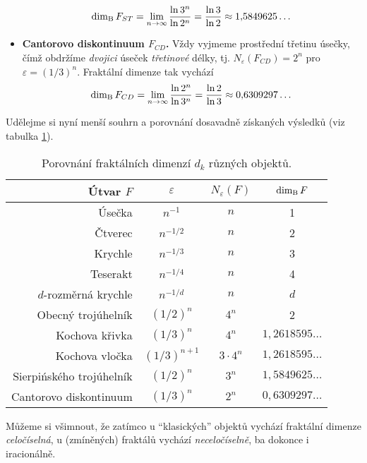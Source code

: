\begin{itemize}
    \begin{equation}\label{eq:sierpinskeho-trojuhelnik-dimenze}
        \operatorname{dim_B}{F_{ST}}=\lim_{n\to\infty}{\dfrac{\ln{3^n}}{\ln{2^{n}}}}=\dfrac{\ln{3}}{\ln{2}}\approx 1{,}5849625\dots
    \end{equation}
    \item \textbf{Cantorovo diskontinuum $F_{CD}$.} Vždy vyjmeme prostřední třetinu úsečky, čímž obdržíme \emph{dvojici} úseček \emph{třetinové} délky, tj. $N_\varepsilon(F_{CD})=2^n$ pro $\varepsilon=(1/3)^n$. Fraktální dimenze tak vychází
    \begin{equation}\label{eq:cantorovo-diskontinuum-dimenze}
        \operatorname{dim_B}{F_{CD}}=\lim_{n\to\infty}{\dfrac{\ln{2^n}}{\ln{3^n}}}=\dfrac{\ln{2}}{\ln{3}}\approx 0{,}6309297\dots
    \end{equation}
\end{itemize}
Udělejme si nyní menší souhrn a porovnání dosavadně získaných výsledků (viz tabulka \ref{table:fraktaly-eukleides-dimenze}).
\begin{table}[h]
    \centering
    \begin{tabular}{r|ccc}
        Útvar $F$                & $\varepsilon$ & $N_\varepsilon(F)$ & $\operatorname{dim_B}{F}$         \\ \hline
        Úsečka                   & $n^{-1}$      & $n$                & 1                  \\
        Čtverec                  & $n^{-1/2}$    & $n$                & 2                  \\
        Krychle                  & $n^{-1/3}$    & $n$                & 3                  \\
        Teserakt                 & $n^{-1/4}$    & $n$                & 4                  \\
        $d$-rozměrná krychle     & $n^{-1/d}$    & $n$                & $d$                \\
        Obecný trojúhelník       & $(1/2)^n$     & $4^n$              & 2                  \\
        Kochova křivka           & $(1/3)^n$     & $4^n$              & $1{,}2618595\dots$ \\
        Kochova vločka           & $(1/3)^{n+1}$ & $3\cdot 4^n$       & $1{,}2618595\dots$ \\
        Sierpińského trojúhelník & $(1/2)^n$     & $3^n$              & $1{,}5849625\dots$ \\
        Cantorovo diskontinuum   & $(1/3)^n$     & $2^n$              & $0{,}6309297\dots$ \\
    \end{tabular}
    \caption{Porovnání fraktálních dimenzí $d_k$ různých objektů.}
    \label{table:fraktaly-eukleides-dimenze}
\end{table}
Můžeme si všimnout, že zatímco u ``klasických'' objektů vychází fraktální dimenze \emph{celočíselná}, u (zmíněných) fraktálů vychází \emph{neceločíselně}, ba dokonce i iracionálně.

